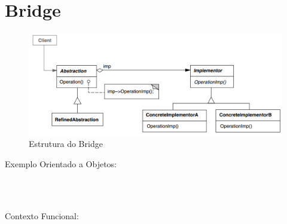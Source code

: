 \section{Bridge}

\begin{figure}[htb]
	\caption{\label{fig_grafico}Estrutura do Bridge}
	\begin{center}
	    \includegraphics[scale=0.5]{5_padroes-contexto-funcional/5.2_estruturais/5.2.2_bridge/diagram.png}
	\end{center}
\end{figure}

Exemplo Orientado a Objetos:

\begin{lstlisting}[caption={Bridge Orientado a Objetos},label=oobridge]



\end{lstlisting}

Contexto Funcional:


\begin{lstlisting}[caption={Bridge Funcional},label=fpbridge]
    

    
\end{lstlisting}